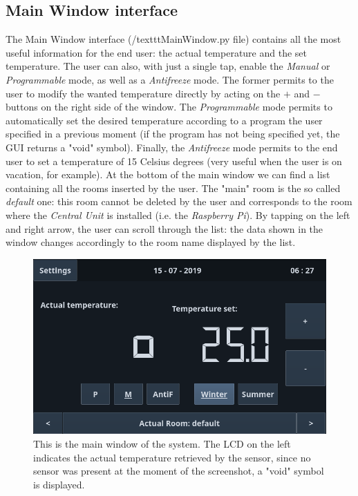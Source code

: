 \documentclass[a4paper]{article}
\begin{document}
        \subsection{Main Window interface}
        The Main Window interface (/texttt{MainWindow.py} file) contains all the most useful information for the end user: the actual temperature and the set temperature. The user can also, with just a single tap, enable the \emph{Manual} or \emph{Programmable} mode, as well as a \emph{Antifreeze} mode.
        The former permits to the user to modify the wanted temperature directly by acting on the $+$ and $-$ buttons on the right side of the window. The \emph{Programmable} mode permits to automatically set the desired temperature according to a program the user specified in a previous moment (if the program has not being specified yet, the GUI returns a "void" symbol).
        Finally, the \emph{Antifreeze} mode permits to the end user to set a temperature of 15 Celsius degrees (very useful when the user is on vacation, for example).
        At the bottom of the main window we can find a list containing all the rooms inserted by the user. The "main" room is the so called \emph{default} one: this room cannot be deleted by the user and corresponds to the room where the \emph{Central Unit} is installed (i.e. the \emph{Raspberry Pi}). By tapping on the left and right arrow, the user can scroll through the list: the data shown in the window changes accordingly to the room name displayed by the list.

        \begin{figure}[htp]
            \centering
            \includegraphics[width=0.8 \columnwidth]{./main.png}
            \caption{
                    \label{fig:main}
                    This is the main window of the system. The LCD on the left indicates the actual temperature retrieved by the sensor, since no sensor was present at the moment of the screenshot, a "void" symbol is displayed.
            }
        \end{figure}
\end{document}
